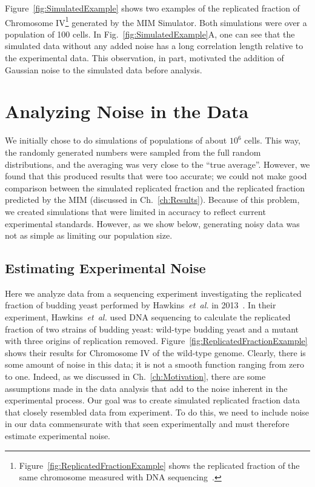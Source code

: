 		Figure~\ref{fig:SimulatedExample} shows two examples of the replicated fraction of Chromosome IV\footnote{
		Figure~\ref{fig:ReplicatedFractionExample} shows the replicated fraction of the same chromosome measured with DNA sequencing~\cite{StochasticTermination}.}
		generated by the MIM Simulator.
		Both simulations were over a population of 100 cells.
		In Fig.~\ref{fig:SimulatedExample}A, one can see that the simulated data without any added noise has a long correlation length relative to the experimental data.
		This observation, in part, motivated the addition of Gaussian noise to the simulated data before analysis.
		
		
	\section{Analyzing Noise in the Data}
	\label{sec:Noise}
	
	We initially chose to do simulations of populations of about $10^6$ cells.
	This way, the randomly generated numbers were sampled from the full random distributions, and the averaging was very close to the ``true average''.
	However, we found that this produced results that were too accurate; we could not make good comparison between the simulated replicated fraction and the replicated fraction predicted by the MIM (discussed in Ch.~\ref{ch:Results}).
	Because of this problem, we created simulations that were limited in accuracy to reflect current experimental standards.
	However, as we show below, generating noisy data was not as simple as limiting our population size.
	
	
		\subsection{Estimating Experimental Noise}
		\label{subsec:SequencingNoise}
		
		Here we analyze data from a sequencing experiment investigating the replicated fraction of budding yeast performed by Hawkins~\emph{et~al.} in 2013~\cite{StochasticTermination}.
		In their experiment, Hawkins~\emph{et~al.} used DNA sequencing to calculate the replicated fraction of two strains of budding yeast: wild-type budding yeast and a mutant with three origins of replication removed.
		Figure~\ref{fig:ReplicatedFractionExample} shows their results for Chromosome IV of the wild-type genome.
		Clearly, there is some amount of noise in this data; it is not a smooth function ranging from zero to one.
		Indeed, as we discussed in Ch.~\ref{ch:Motivation}, there are some assumptions made in the data analysis that add to the noise inherent in the experimental process.
		Our goal was to create simulated replicated fraction data that closely resembled data from experiment.
		To do this, we need to include noise in our data commensurate with that seen experimentally and must therefore estimate experimental noise.
		
